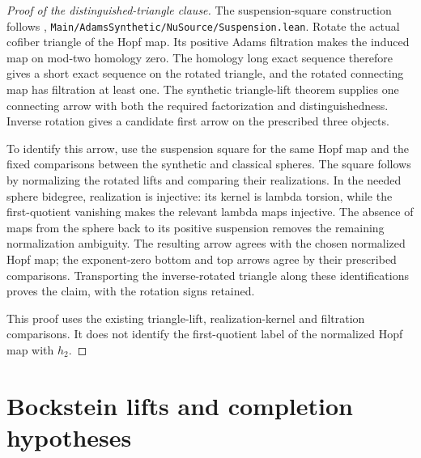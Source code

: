 \begin{proof}[Proof of the distinguished-triangle clause]
The suspension-square construction follows
\cite{KIPMainSourcec60fbbbb93ee},
\texttt{Main/AdamsSynthetic/NuSource/Suspension.lean}.
Rotate the actual cofiber triangle of the Hopf map. Its positive Adams
filtration makes the induced map on mod-two homology zero. The homology
long exact sequence therefore gives a short exact sequence on the
rotated triangle, and the rotated connecting map has filtration at
least one. The synthetic triangle-lift theorem supplies one
connecting arrow with both the required factorization and
distinguishedness. Inverse rotation gives a candidate first arrow on
the prescribed three objects.

To identify this arrow, use the suspension square for the same Hopf
map and the fixed comparisons between the synthetic and classical
spheres. The square follows by normalizing the rotated lifts and
comparing their realizations. In the needed sphere bidegree,
realization is injective: its kernel is lambda torsion, while the
first-quotient vanishing makes the relevant lambda maps injective.
The absence of maps from the sphere back to its positive suspension
removes the remaining normalization ambiguity. The resulting arrow
agrees with the chosen normalized Hopf map; the exponent-zero bottom
and top arrows agree by their prescribed comparisons. Transporting
the inverse-rotated triangle along these identifications proves the
claim, with the rotation signs retained.

This proof uses the existing triangle-lift, realization-kernel and
filtration comparisons. It does not identify the first-quotient label
of the normalized Hopf map with $h_2$.
\end{proof}


\section{Bockstein lifts and completion hypotheses}
\label{sem:Literature:lambda-completeness}

